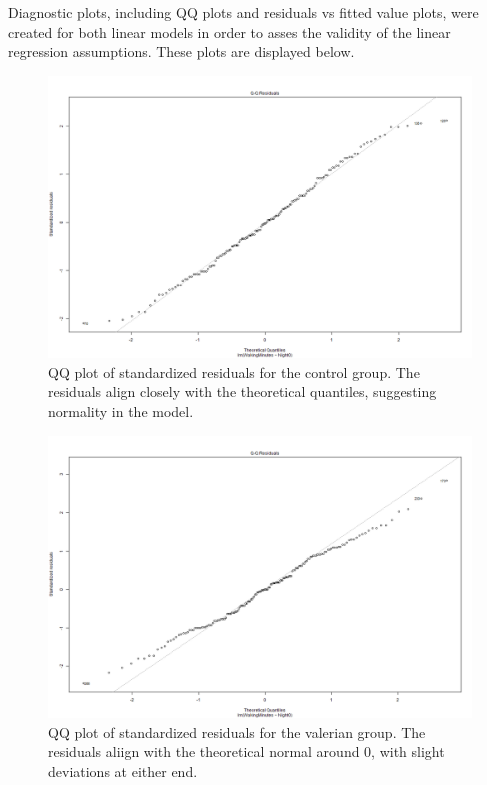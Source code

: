\documentclass[10pt,preprintnumbers,amsmath,amssymb,floatfix,twocolumn,prl]{revtex4-2}
\begin{document}
Diagnostic plots, including QQ plots and residuals vs fitted value plots, were created for both linear models in order to asses the validity of the linear regression assumptions. These plots are displayed below. 
\begin{figure}[H]
\centering
\includegraphics[width=0.95\linewidth]{QQ_control.png}
\caption{QQ plot of standardized residuals for the control group. The residuals align closely with the theoretical quantiles, suggesting normality in the model.}
\end{figure}

\begin{figure}[H]
\centering
\includegraphics[width=0.95\linewidth]{QQ_valerian.png}
\caption{QQ plot of standardized residuals for the valerian group. The residuals aliign with the theoretical normal around 0, with slight deviations at either end.}
\end{figure}
\end{document}
